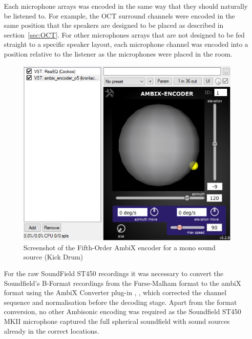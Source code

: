 				Each microphone arrays was encoded in the same way that they should naturally be listened to. For example, the OCT surround channels were encoded in the same position that the speakers are designed to be placed as described in section~\ref{sec:OCT}. For other microphones arrays that are not designed to be fed straight to a specific speaker layout, each microphone channel was encoded into a position relative to the listener as the microphones were placed in the room.

				\begin{figure}[h]
				\begin{center}
					\includegraphics[width = \linewidth]{images/other/ambix.png}
					\caption{Screenshot of the Fifth-Order AmbiX encoder for a mono sound source (Kick Drum)}
					\label{ambixEncode}
				\end{center}
				\end{figure}

				For the raw SoundField ST450 recordings it was necessary to convert the Soundfield's B-Format recordings from the Furse-Malham format to the ambiX format using the AmbiX Converter plug-in \cite{AmbixPLUGINS}, \cite{AmbixDOWNLOAD}, which corrected the channel sequence and normalisation before the decoding stage. Apart from the format conversion, no other Ambisonic encoding was required as the Soundfield ST450 MKII microphone captured the full spherical soundfield with sound sources already in the correct locations. 

